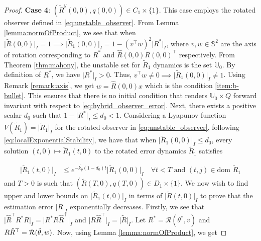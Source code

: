 \documentclass{article}
\newcommand{\dom}{\text{dom }}
\newcommand{\Rtilde}{\tilde{R}}
\newcommand{\normSOthree}[1]{{{\vert}#1 {\vert}_I}}
\newcommand{\expo}[1]{e^{#1}}
\newcommand{\Rstar}{{R^*}}
\begin{document}
\begin{proof}
\textbf{Case 4}: ${(\Rtilde^y(0,0), q(0,0))}\in C_1\times\{1\}$. This case employs the rotated observer defined in \eqref{eq:unstable_observer}. From Lemma \ref{lemma:normOfProduct}, we see that when  $\normSOthree{\Rtilde(0,0)}=1 \implies \normSOthree{\Rtilde_1(0,0)} = 1 - (v^\top w)^2\normSOthree{\Rstar}$, where $v, w\in\mathbb{S}^2$ are the axis of rotation corresponding to $\Rstar$ and $\hat{R}(0,0)R(0,0)^\top $ respectively. From Theorem \ref{thm:mahony}, the unstable set for $\Rtilde_1$ dynamics is the set $\mathbb{U}_0$. By definition of $\Rstar$, we have $\normSOthree{\Rstar} > 0$. Thus, $v^\top w \neq 0 \implies \normSOthree{\Rtilde_1(0,0)} \neq 1$. Using Remark \ref{remark:axis}, we get $w = \hat{R}(0,0)x$ which is the condition \ref{item:b-bullet}. This ensures that there is no initial condition that renders $\mathbb{U}_0\times Q$ forward invariant with respect to \eqref{eq:hybrid_observer_error}. Next, there exists a positive scalar $d_0$ such that $1 - \normSOthree{\Rstar}\leq d_0 < 1$. Considering a Lyapunov function $V(\Rtilde_1) = \normSOthree{\Rtilde_1}$ for the rotated observer in \eqref{eq:unstable_observer}, following \eqref{eq:localExponentialStability}, we have that when $\normSOthree{\Rtilde_1(0,0)} \leq d_0$, every solution $(t,0)\mapsto \Rtilde_1(t,0)$ to the rotated error dynamics $\Rtilde_1$  satisfies

\begin{align}\label{eq:R1tilde_exponentialconvergence}
    \normSOthree{\Rtilde_1(t,0)} &\leq \expo{-\overline{k_p}(1-d_0)t}\normSOthree{\Rtilde_1(0,0)} \quad \forall t < T \text{ and } (t,j)\in \dom \Rtilde_1
\end{align}
and $T > 0$ is such that $(\Rtilde(T,0), q(T,0))\in D_1\times \{1\}$. We now wish to find upper and lower bounds on $\normSOthree{\Rtilde_1(t,0)}$ in terms of $\normSOthree{\Rtilde(t,0)}$ to prove that the estimation error $\normSOthree{\Rtilde}$ exponentially decreases. Firstly, we see that $\normSOthree{\hat{R}^\top \Rstar R} = \normSOthree{\Rstar R\hat{R}^\top }$ and $\normSOthree{R\hat{R}^\top } = \normSOthree{\Rtilde}$. Let $\Rstar = \mathcal{R}(\theta^*, v)$ and $R\hat{R}^\top  = \mathcal{R}(\Tilde{\theta}, w)$. Now, using Lemma \ref{lemma:normOfProduct}, we get 


\end{proof}
\end{document}

